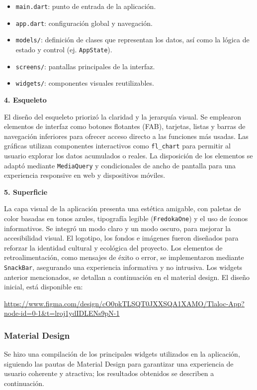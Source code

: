 \begin{itemize}
  \item \texttt{main.dart}: punto de entrada de la aplicación.
  \item \texttt{app.dart}: configuración global y navegación.
  \item \texttt{models/}: definición de clases que representan los datos, así como la lógica de estado y control (ej. \texttt{AppState}). 
  \item \texttt{screens/}: pantallas principales de la interfaz.
  \item \texttt{widgets/}: componentes visuales reutilizables. 
\end{itemize}


\textbf{4. Esqueleto}

El diseño del esqueleto priorizó la claridad y la jerarquía visual. Se emplearon elementos de interfaz como botones flotantes (FAB), tarjetas, listas y barras de navegación inferiores para ofrecer acceso directo a las funciones más usadas. Las gráficas utilizan componentes interactivos como \texttt{fl\_chart} para permitir al usuario explorar los datos acumulados o reales. La disposición de los elementos se adaptó mediante \texttt{MediaQuery} y condicionales de ancho de pantalla para una experiencia responsive en web y dispositivos móviles.

\textbf{5. Superficie}

La capa visual de la aplicación presenta una estética amigable, con paletas de color basadas en tonos azules, tipografía legible (\texttt{FredokaOne}) y el uso de íconos informativos. Se integró un modo claro y un modo oscuro, para mejorar la accesibilidad visual. El logotipo, los fondos e imágenes fueron diseñados para reforzar la identidad cultural y ecológica del proyecto. Los elementos de retroalimentación, como mensajes de éxito o error, se implementaron mediante \texttt{SnackBar}, asegurando una experiencia informativa y no intrusiva.
Los widgets anterior mencionados, se detallan a continuación en el material design. El diseño inicial, está disponible en:
  \begin{center}
    \url{https://www.figma.com/design/cO0pkTLSQT0JXXSQA1XAMO/Tlaloc-App?node-id=0-1&t=lroj1ydIDLENs9pN-1}
  \end{center}


\subsubsection*{Material Design}
Se hizo una compilación de los principales widgets utilizados en la aplicación, siguiendo las pautas de Material Design para garantizar una experiencia de usuario coherente y atractiva; los resultados obtenidos se describen a continuación.


